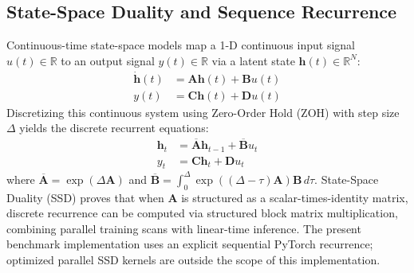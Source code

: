 \documentclass[pdflatex,sn-mathphys-num]{sn-jnl}%
\begin{document}
\subsection{State-Space Duality and Sequence Recurrence}
Continuous-time state-space models map a 1-D continuous input signal $u(t) \in \mathbb{R}$ to an output signal $y(t) \in \mathbb{R}$ via a latent state $\mathbf{h}(t) \in \mathbb{R}^N$:
\begin{align}
\dot{\mathbf{h}}(t) &= \mathbf{A} \mathbf{h}(t) + \mathbf{B} u(t) \\
y(t) &= \mathbf{C} \mathbf{h}(t) + \mathbf{D} u(t)
\end{align}
Discretizing this continuous system using Zero-Order Hold (ZOH) with step size $\Delta$ yields the discrete recurrent equations:
\begin{align}
\mathbf{h}_t &= \overline{\mathbf{A}} \mathbf{h}_{t-1} + \overline{\mathbf{B}} u_t \\
y_t &= \mathbf{C} \mathbf{h}_t + \mathbf{D} u_t
\end{align}
where $\overline{\mathbf{A}} = \exp(\Delta \mathbf{A})$ and $\overline{\mathbf{B}} = \int_0^\Delta \exp((\Delta - \tau)\mathbf{A})\mathbf{B}\,d\tau$. State-Space Duality (SSD) \cite{dao2024transformers} proves that when $\mathbf{A}$ is structured as a scalar-times-identity matrix, discrete recurrence can be computed via structured block matrix multiplication, combining parallel training scans with linear-time inference. The present benchmark implementation uses an explicit sequential PyTorch recurrence; optimized parallel SSD kernels are outside the scope of this implementation.
\end{document}
